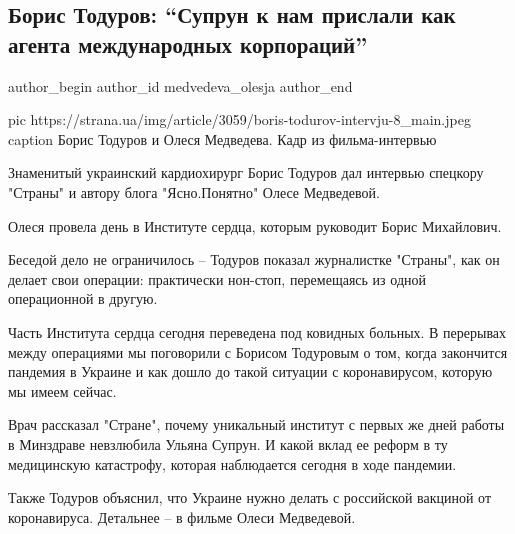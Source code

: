  
 
 
 
 
 
\subsection{Борис Тодуров: \enquote{Супрун к нам прислали как агента международных корпораций}}
\label{sec:11_12_2020.news.ua.strana.medvedeva_olesja.1.todurov_interview}
\ifcmt
	author_begin
   author_id medvedeva_olesja
	author_end
\fi


\ifcmt
  pic https://strana.ua/img/article/3059/boris-todurov-intervju-8_main.jpeg
  caption Борис Тодуров и Олеся Медведева. Кадр из фильма-интервью 
\fi

Знаменитый украинский кардиохирург Борис Тодуров дал интервью спецкору "Страны"
и автору блога "Ясно.Понятно" Олесе Медведевой. 

Олеся провела день в Институте сердца, которым руководит Борис Михайлович.

Беседой дело не ограничилось – Тодуров показал журналистке "Страны", как он
делает свои операции: практически нон-стоп, перемещаясь из одной операционной в
другую.

Часть Института сердца сегодня переведена под ковидных больных. В перерывах
между операциями мы поговорили с Борисом Тодуровым о том, когда закончится
пандемия в Украине и как дошло до такой ситуации с коронавирусом, которую мы
имеем сейчас.  

Врач рассказал "Стране", почему уникальный институт с первых же дней работы в
Минздраве невзлюбила Ульяна Супрун. И какой вклад ее реформ в ту медицинскую
катастрофу, которая наблюдается сегодня в ходе пандемии. 

Также Тодуров объяснил, что Украине нужно делать с российской вакциной от
коронавируса. Детальнее – в фильме Олеси Медведевой.

